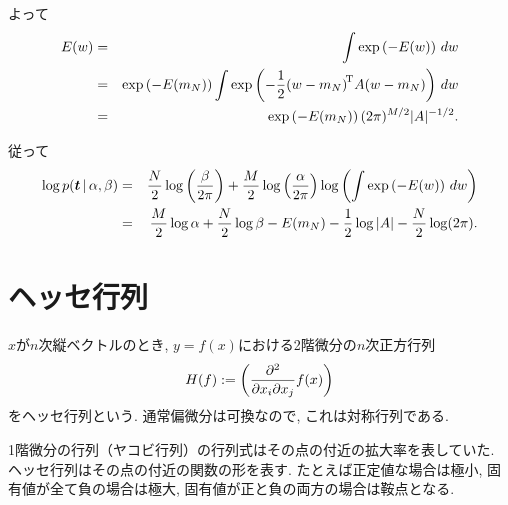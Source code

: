 よって
\begin{eqnarray*}
E(w) &=& \int \exp\left(-E(w)\right)\,dw \\
     &=& \exp\left(-E(m_N)\right) \int \exp\left(-\frac{1}{2}{(w-m_N)}^{\!\mathrm{T}}A{(w-m_N)}\right)\,dw\\
     &=& \exp\left(-E(m_N)\right) (2\pi)^{M/2} |A|^{-1/2}.
\end{eqnarray*}

従って
\begin{eqnarray}\label{log_evidence}
\log p(\bm{t}\,|\,\alpha,\beta)\nonumber
 &=& \frac{N}{2} \log\left(\frac{\beta}{2\pi}\right) + \frac{M}{2} \log\left(\frac{\alpha}{2\pi}\right) \log \left(\int \exp\left(-E(w)\right)\,dw\right)\\
 &=& \frac{M}{2} \log \alpha + \frac{N}{2} \log \beta - E(m_N) - \frac{1}{2}\log |A| - \frac{N}{2} \log(2\pi).
\end{eqnarray}
\vspace{0pt}

\section{ヘッセ行列}
$x$が$n$次縦ベクトルのとき, $y=f(x)$における2階微分の$n$次正方行列
$$
H(f):=\left(\frac{\partial^2}{\partial x_i \partial x_j}f(x)\right)
$$
をヘッセ行列という.
通常偏微分は可換なので, これは対称行列である.
\pagebreak

1階微分の行列（ヤコビ行列）の行列式はその点の付近の拡大率を表していた.
ヘッセ行列はその点の付近の関数の形を表す.
たとえば正定値な場合は極小, 固有値が全て負の場合は極大, 固有値が正と負の両方の場合は鞍点となる.

